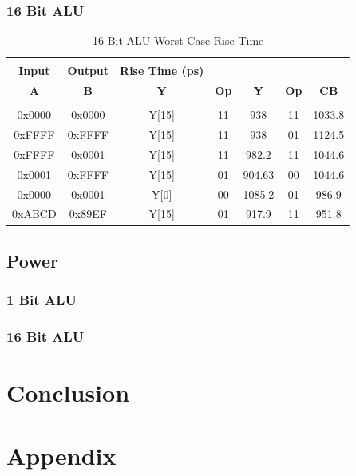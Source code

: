 \documentclass[11pt]{article}
\begin{document}
{		
		\subsubsection{16 Bit ALU}
		
			\begin{table}[H]
				\centering
				\caption{16-Bit ALU Worst Case Rise Time}
				\label{tab:ALU-16-Bit-Risetime}
				\begin{tabular}{|ccccccc|}
					\hline \\
					\textbf{Input} & \textbf{Output} & \textbf{Rise Time (ps)} & \textbf{} & \textbf{} & \textbf{} & \textbf{} \\
					\textbf{A} & \textbf{B} & \textbf{Y} & \textbf{Op} & \textbf{Y} & \textbf{Op} & \textbf{CB} \\
					\hline \\
					0x0000 & 0x0000 & Y{[}15{]} & 11 & 938 & 11 & 1033.8 \\
					0xFFFF & 0xFFFF & Y{[}15{]} & 11 & 938 & 01 & 1124.5 \\
					0xFFFF & 0x0001 & Y{[}15{]} & 11 & 982.2 & 11 & 1044.6 \\
					0x0001 & 0xFFFF & Y{[}15{]} & 01 & 904.63 & 00 & 1044.6 \\
					0x0000 & 0x0001 & Y{[}0{]} & 00 & 1085.2 & 01 & 986.9 \\
					0xABCD & 0x89EF & Y{[}15{]} & 01 & 917.9 & 11 & 951.8 \\
					\hline
				\end{tabular}
			\end{table}
	
	\subsection{Power}
		
		\subsubsection{1 Bit ALU}
		
		\subsubsection{16 Bit ALU}

\section{Conclusion}


\section{Appendix}

}
\end{document}
